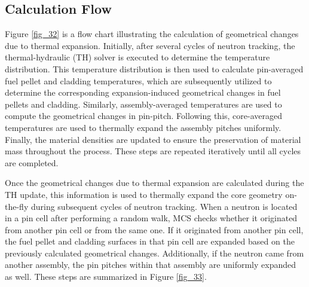 \subsection{Calculation Flow} \label{sec34}

Figure \ref{fig_32} is a flow chart illustrating the calculation of geometrical changes due to thermal expansion. Initially, after several cycles of neutron tracking, the thermal-hydraulic (TH) solver is executed to determine the temperature distribution. This temperature distribution is then used to calculate pin-averaged fuel pellet and cladding temperatures, which are subsequently utilized to determine the corresponding expansion-induced geometrical changes in fuel pellets and cladding. Similarly, assembly-averaged temperatures are used to compute the geometrical changes in pin-pitch. Following this, core-averaged temperatures are used to thermally expand the assembly pitches uniformly. Finally, the material densities are updated to ensure the preservation of material mass throughout the process. These steps are repeated iteratively until all cycles are completed.

Once the geometrical changes due to thermal expansion are calculated during the TH update, this information is used to thermally expand the core geometry on-the-fly during subsequent cycles of neutron tracking. When a neutron is located in a pin cell after performing a random walk, MCS checks whether it originated from another pin cell or from the same one. If it originated from another pin cell, the fuel pellet and cladding surfaces in that pin cell are expanded based on the previously calculated geometrical changes. Additionally, if the neutron came from another assembly, the pin pitches within that assembly are uniformly expanded as well. These steps are summarized in Figure \ref{fig_33}.

